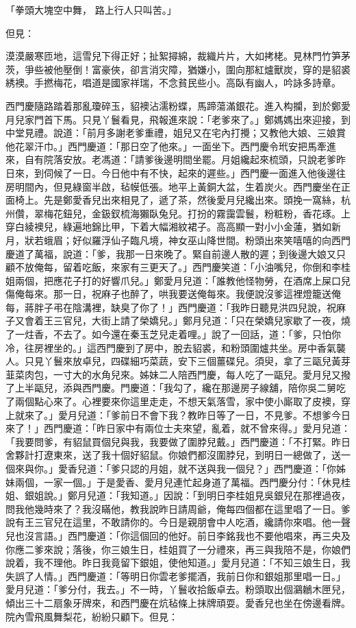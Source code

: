 「拳頭大塊空中舞，  路上行人只叫苦。」

但見：

漠漠嚴寒匝地，這雪兒下得正好；扯絮撏綿，裁織片片，大如拷栳。見林門竹笋茅茨，爭些被他壓倒！富豪俠，卻言消灾障，猶嫌小，圍向那紅爐獸炭，穿的是貂裘綉襖。手撚梅花，唱道是國家祥瑞，不念貧民些小。高臥有幽人，吟詠多詩章。

西門慶隨路踏着那亂瓊碎玉，貂襖沾濡粉蝶，馬蹄蕩滿銀花。進入构攔，到於鄭愛月兒家門首下馬。只見丫鬟看見，飛報進來說：「老爹來了。」鄭媽媽出來迎接，到中堂見禮。說道：「前月多謝老爹重禮，姐兒又在宅內打攪；又教他大娘、三娘賞他花翠汗巾。」西門慶道：「那日空了他來。」一面坐下。西門慶令玳安把馬牽進來，自有院落安放。老馮道：「請爹後邊明間坐罷。月姐纔起來梳頭，只說老爹昨日來，到伺候了一日。今日他中有不快，起來的遲些。」西門慶一面進入他後邊往房明間內，但見綠窗半啟，毡幙低張。地平上黃銅大盆，生着炭火。西門慶坐在正面椅上。先是鄭愛香兒出來相見了，遞了茶，然後愛月兒纔出來。頭挽一窩絲，杭州儹，翠梅花鈕兒，金鈒釵梳海獺臥兔兒。打扮的霧靄雲鬟，粉粧粉，香花琢。上穿白綾襖兒，綠遍地錦比甲，下着大幅湘紋裙子。高高顯一對小小金蓮，猶如新月，狀若蛾眉；好似羅浮仙子臨凡境，神女巫山降世間。粉頭出來笑嘻嘻的向西門慶道了萬福，說道：「爹，我那一日來晚了。緊自前邊人散的遲；到後邊大娘又只顧不放俺每，留着吃飯，來家有三更天了。」西門慶笑道：「小油嘴兒，你倒和李桂姐兩個，把應花子打的好響爪兒。」鄭愛月兒道：「誰教他怪物勞，在酒席上屎口兒傷俺每來。那一日，祝麻子也醉了，哄我要送俺每來。我便說沒爹這裡燈籠送俺每，蔣胖子弔在陰溝裡，缺臭了你了！」西門慶道：「我昨日聽見洪四兒說，祝麻子又會着王三官兒，大街上請了榮嬌兒。」鄭月兒道：「只在榮嬌兒家歇了一夜，燒了一炷香，不去了。如今還在秦玉芝兒走着哩。」說了一回話，道：「爹，只怕你冷，往房裡坐的。」這西門慶到了房中，脫去貂裘，和粉頭圍爐共坐。房中香氣襲人。只見丫鬟來放卓兒，四碟細巧菜蔬，安下三個薑碟兒。須臾，拿了三甌兒黃芽韮菜肉包，一寸大的水角兒來。姊妹二人陪西門慶，每人吃了一甌兒。愛月兒又撥了上半甌兒，添與西門慶。門慶道：「我勾了，纔在那邊房子線舖，陪你吳二舅吃了兩個點心來了。心裡要來你這里走走，不想天氣落雪，家中使小廝取了皮襖，穿上就來了。」愛月兒道：「爹前日不會下我？教昨日等了一日，不見爹。不想爹今日來了！」西門慶道：「昨日家中有兩位士夫來望，亂着，就不曾來得。」愛月兒道：「我要問爹，有貂鼠買個兒與我，我要做了圍脖兒戴。」西門慶道：「不打緊。昨日舍夥計打遼東來，送了我十個好貂鼠。你娘們都沒圍脖兒，到明日一總做了，送一個來與你。」愛香兒道：「爹只認的月姐，就不送與我一個兒？」西門慶道：「你姊妹兩個，一家一個。」于是愛香、愛月兒連忙起身道了萬福。西門慶分付：「休見桂姐、銀姐說。」鄭月兒道：「我知道。」因說：「到明日李桂姐見吳銀兒在那裡過夜，問我他幾時來了？我沒瞞他，教我說昨日請周爺，俺每四個都在這里唱了一日。爹說有王三官兒在這里，不敢請你的。今日是親朋會中人吃酒，纔請你來唱。他一聲兒也沒言語。」西門慶道：「你這個回的他好。前日李銘我也不要他唱來，再三央及你應二爹來說；落後，你三娘生日，桂姐買了一分禮來，再三與我陪不是，你娘們說着，我不理他。昨日我竟留下銀姐，使他知道。」愛月兒道：「不知三娘生日，我失誤了人情。」西門慶道：「等明日你雲老爹擺酒，我前日你和銀姐那里唱一日。」愛月兒道：「爹分付，我去。」不一時，丫鬟收拾飯卓去。粉頭取出個鸂鶒木匣兒，傾出三十二扇象牙牌來，和西門慶在炕毡條上抹牌頑耍。愛香兒也坐在傍邊看牌。院內雪飛風舞梨花，紛紛只顧下。但見：

